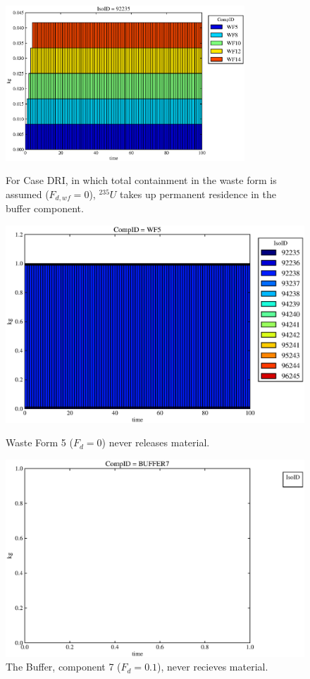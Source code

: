 
\begin{figure}[ht]
\centering
\includegraphics[width=0.8\textwidth]{./chapters/demonstration/base/drI.eps}
\caption[$^{235}U$ residence. Degradation Rate Waste Form No Release.]{
For Case DRI, in which total containment in the waste form is assumed ($F_{d,wf}=0$), 
$^{235}U$ takes up permanent residence in the buffer component.
}
\label{fig:drIall}
\begin{minipage}[b]{0.45\linewidth}

  \includegraphics[width=\textwidth]{./chapters/demonstration/base/drI1.eps}
  \caption[DRI Waste Form Contaminants.]{
    Waste Form 5 ($F_d = 0$) never releases material.
    }
  \label{fig:drIwf5}
  
  \includegraphics[width=\textwidth]{./chapters/demonstration/base/drI3.eps}
  \caption[Case DRI Buffer Contaminants]{
    The Buffer, component 7 ($F_d = 0.1$), never recieves material.
    }
  \label{fig:drIbuff}


\end{minipage}
\end{figure}
